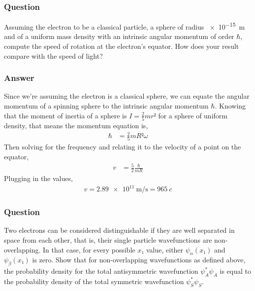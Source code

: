 \subsubsection{Question}

Assuming the electron to be a classical particle, a sphere of radius 
\SI{e-15}{\m} and of a uniform mass density with an intrinsic angular 
momentum of order $ℏ$, compute the speed of rotation at the electron's 
equator. How does your result compare with the speed of light?

\subsubsection{Answer}

Since we're assuming the electron is a classical sphere, we can equate the 
angular momentum of a spinning sphere to the intrinsic angular momentum $ℏ$. 
Knowing that the moment of inertia of a sphere is $I = \frac 25 m r²$ for a 
sphere of uniform density, that means the momentum equation is,
\begin{align*}
	ℏ &= \frac 25 m R² ω
\end{align*}
Then solving for the frequency and relating it to the velocity of a point on
the equator,
\begin{align*}
	v &= \frac 52 \frac{ℏ}{mR}
\end{align*}
Plugging in the values,
\begin{align}
	\boxed{ v = \SI{2.89e11}{\m\per\s} = \SI{965}{c} }
\end{align}


\subsubsection{Question}

Two electrons can be considered distinguishable if they are well separated 
in space from each other, that is, their single particle wavefunctions are 
non-overlapping. In that case, for every possible $x₁$ value, either 
$ψ_α(x₁)$ and $ψ_β(x₁)$ is zero. Show that for non-overlapping wavefunctions 
as defined above, the probability density for the total antisymmetric 
wavefunction $ψ^*_Aψ_A$ is equal to the probability density of the total 
symmetric wavefunction $ψ^*_Sψ_S$.

